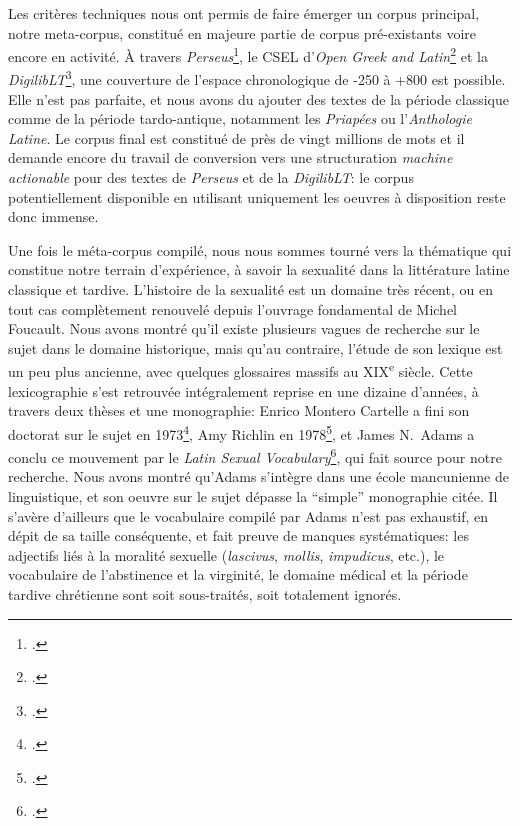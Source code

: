 Les critères techniques nous ont permis de faire émerger un corpus principal, notre meta-corpus, constitué en majeure partie de corpus pré-existants voire encore en activité. À travers \textit{Perseus}\footcite{perseus_latinLit}, le CSEL d'\textit{Open Greek and Latin}\footcite{csel_latinlit} et la \textit{DigilibLT}\footcite{digiliblt}, une couverture de l'espace chronologique de -250 à +800 est possible. Elle n'est pas parfaite, et nous avons du ajouter des textes de la période classique comme de la période tardo-antique, notamment les \textit{Priapées} ou l'\textit{Anthologie Latine}. Le corpus final est constitué de près de vingt millions de mots et il demande encore du travail de conversion vers une structuration \textit{machine actionable} pour des textes de \textit{Perseus} et de la \textit{DigilibLT}: le corpus potentiellement disponible en utilisant uniquement les oeuvres à disposition reste donc immense.

Une fois le méta-corpus compilé, nous nous sommes tourné vers la thématique qui constitue notre terrain d'expérience, à savoir la sexualité dans la littérature latine classique et tardive. L'histoire de la sexualité est un domaine très récent, ou en tout cas complètement renouvelé depuis l'ouvrage fondamental de Michel Foucault. Nous avons montré qu'il existe plusieurs vagues de recherche sur le sujet dans le domaine historique, mais qu'au contraire, l'étude de son lexique est un peu plus ancienne, avec quelques glossaires massifs au XIX\textsuperscript{e} siècle. Cette lexicographie s'est retrouvée intégralement reprise en une dizaine d'années, à travers deux thèses et une monographie: Enrico Montero Cartelle a fini son doctorat sur le sujet en 1973\footcite{montero_cartelle_aspectos_1973}, Amy Richlin en 1978\footcite{richlin_sexual_1978}, et James N.~Adams a conclu ce mouvement par le \textit{Latin Sexual Vocabulary}\footcite{adams}, qui fait source pour notre recherche. Nous avons montré qu'Adams s'intègre dans une école mancunienne de linguistique, et son oeuvre sur le sujet dépasse la \enquote{simple} monographie citée. Il s'avère d'ailleurs que le vocabulaire compilé par Adams n'est pas exhaustif, en dépit de sa taille conséquente, et fait preuve de manques systématiques: les adjectifs liés à la moralité sexuelle (\textit{lascivus}, \textit{mollis}, \textit{impudicus}, etc.), le vocabulaire de l'abstinence et la virginité, le domaine médical et la période tardive chrétienne sont soit sous-traités, soit totalement ignorés.

